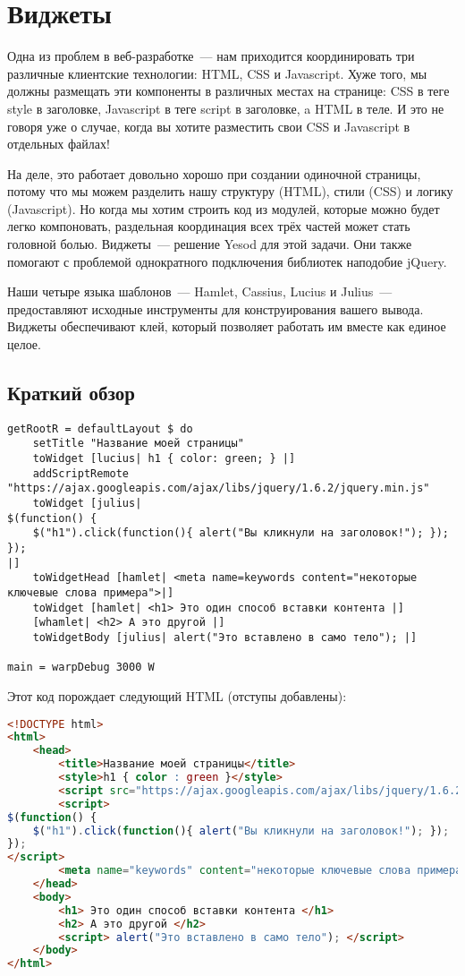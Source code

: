\chapter{Виджеты}\label{chap:widgets}
Одна из проблем в веб-разработке~--- нам приходится координировать три
различные клиентские технологии: HTML, CSS и Javascript. Хуже того, мы должны
размещать эти компоненты в различных местах на странице: CSS в теге style в
заголовке, Javascript в теге script в заголовке, a HTML в теле. И это не говоря
уже о случае, когда вы хотите разместить свои CSS и Javascript в отдельных
файлах!

На деле, это работает довольно хорошо при создании одиночной страницы, потому
что мы можем разделить нашу структуру (HTML), стили (CSS) и логику
(Javascript). Но когда мы хотим строить код из модулей, которые можно будет
легко компоновать, раздельная координация всех трёх частей может стать головной
болью. Виджеты~--- решение Yesod для этой задачи. Они также помогают с
проблемой однократного подключения библиотек наподобие jQuery.

Наши четыре языка шаблонов~--- Hamlet, Cassius, Lucius и Julius~---
предоставляют исходные инструменты для конструирования вашего вывода. Виджеты
обеспечивают клей, который позволяет работать им вместе как единое целое.

\section{Краткий обзор}
\begin{lstlisting}
getRootR = defaultLayout $ do
    setTitle "Название моей страницы"
    toWidget [lucius| h1 { color: green; } |]
    addScriptRemote "https://ajax.googleapis.com/ajax/libs/jquery/1.6.2/jquery.min.js"
    toWidget [julius|
$(function() {
    $("h1").click(function(){ alert("Вы кликнули на заголовок!"); });
});
|]
    toWidgetHead [hamlet| <meta name=keywords content="некоторые ключевые слова примера">|]
    toWidget [hamlet| <h1> Это один способ вставки контента |]
    [whamlet| <h2> А это другой |]
    toWidgetBody [julius| alert("Это вставлено в само тело"); |]

main = warpDebug 3000 W
\end{lstlisting}
Этот код порождает следующий HTML (отступы добавлены):
\begin{lstlisting}[language=HTML]
<!DOCTYPE html>
<html>
    <head>
        <title>Название моей страницы</title>
        <style>h1 { color : green }</style>
        <script src="https://ajax.googleapis.com/ajax/libs/jquery/1.6.2/jquery.min.js"></script>
        <script>
$(function() {
    $("h1").click(function(){ alert("Вы кликнули на заголовок!"); });
});
</script>
        <meta name="keywords" content="некоторые ключевые слова примера">
    </head>
    <body>
        <h1> Это один способ вставки контента </h1>
        <h2> А это другой </h2>
        <script> alert("Это вставлено в само тело"); </script>
    </body>
</html>
\end{lstlisting}

